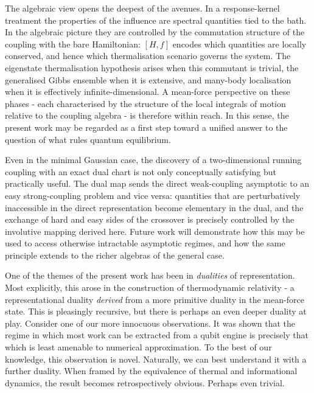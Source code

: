 The algebraic view opens the deepest of the avenues. In a response-kernel treatment the properties
of the influence are spectral quantities tied to the bath. In the algebraic picture they are
controlled by the commutation structure of the coupling with the bare Hamiltonian: $[H,f]$ encodes
which quantities are locally conserved, and hence which thermalisation scenario governs the system.
The eigenstate thermalisation hypothesis arises when this commutant is trivial, the generalised
Gibbs ensemble when it is extensive, and many-body localisation when it is effectively
infinite-dimensional. A mean-force perspective on these phases - each characterised by the
structure of the local integrals of motion relative to the coupling algebra - is therefore within
reach. In this sense, the present work may be regarded as a first step toward a unified answer to
the question of what rules quantum equilibrium.

Even in the minimal Gaussian case, the discovery of a two-dimensional running coupling with an
exact dual chart is not only conceptually satisfying but practically useful. The dual map sends the
direct weak-coupling asymptotic to an easy strong-coupling problem and vice versa: quantities that
are perturbatively inaccessible in the direct representation become elementary in the dual, and the
exchange of hard and easy sides of the crossover is precisely controlled by the involutive mapping
derived here. Future work will demonstrate how this may be used to access otherwise intractable
asymptotic regimes, and how the same principle extends to the richer algebras of the general case.



 One of the themes of the present work has been in \emph{dualities} of representation. Most explicitly, this arose in the construction of thermodynamic relativity - a representational duality \emph{derived} from a more primitive duality in the mean-force state. This is pleasingly recursive, but there is perhaps an even deeper duality at play.  Consider one of our more innocuous observations. It was shown that the regime in which most work can be extracted from a qubit engine is precisely that which is least amenable to numerical approximation. To the best of our knowledge, this observation is novel. Naturally, we can best understand it with a further duality. When framed by the equivalence of thermal and informational dynamics, the result becomes retrospectively obvious. Perhaps even trivial.  
 
